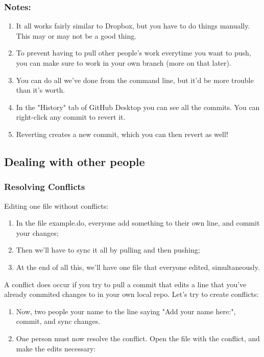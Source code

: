 \documentclass{beamer}
\begin{document}
\begin{frame}
	\frametitle{Notes:}
	\begin{enumerate}
		\item It all works fairly similar to Dropbox, but you have to do things manually. This may or may not be a good thing.
		\item To prevent having to pull other people's work everytime you want to push, you can make sure to work in your own branch (more on that later).
		\item You can do all we've done from the command line, but it'd be more trouble than it's worth.
		\item In the "History" tab of GitHub Desktop you can see all the commits. You can right-click any commit to revert it. 
		\item Reverting creates a new commit, which you can then revert as well!
	\end{enumerate}
\end{frame}

\subsection{Dealing with other people}

\begin{frame}
	\frametitle{Resolving Conflicts}
	Editing one file without conflicts:
	\begin{enumerate}
		\item<2-> In the file example.do, everyone add something to their own line, and commit your changes;
		\item<2-> Then we'll have to sync it all by pulling and then pushing;
		\item<2-> At the end of all this, we'll have one file that everyone edited, simultaneously.
	\end{enumerate}
	A conflict does occur if you try to pull a commit that edits a line that you've already commited changes to in your own local repo. Let's try to create conflicts:
	\begin{enumerate}
		\item<3-> Now, two people your name to the line saying "Add your name here:", commit, and sync changes.
		\item<3-> One person must now resolve the conflict. Open the file with the conflict, and make the edits necessary:
	\end{enumerate}
	
\end{frame}
\end{document}

